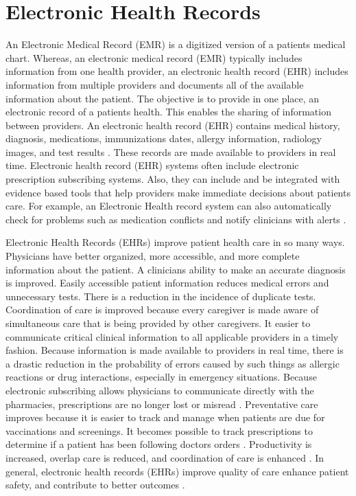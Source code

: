 \documentclass[sigconf]{acmart}
\begin{document}
\section{Electronic Health Records}

An Electronic Medical Record (EMR) is a digitized version of a patients medical chart.  Whereas, an electronic medical record (EMR) typically includes information from one health provider, an electronic health record (EHR) includes information from multiple providers and documents all of the available information about the patient.  The objective is to provide in one place, an electronic record of a patients health. This enables the sharing of information between providers. An electronic health record (EHR) contains medical history, diagnosis, medications, immunizations dates, allergy information, radiology images, and test results \cite{www-google-EHR}. These records are made available to providers in real time.  Electronic health record (EHR) systems often include electronic prescription subscribing systems. Also, they can include and be integrated with evidence based tools that help providers make immediate decisions about patients care. For example, an Electronic Health record system can also automatically check for problems such as medication conflicts and notify clinicians with alerts \cite{www-google-elec}.

Electronic Health Records (EHRs) improve patient health care in so many ways. Physicians have better organized, more accessible, and more complete information about the patient.  A clinicians ability to make an accurate diagnosis is improved.  Easily accessible patient information reduces medical errors and unnecessary tests. There is a reduction in the incidence of duplicate tests. Coordination of care is improved because every caregiver is made aware of simultaneous care that is being provided by other caregivers. It easier to communicate critical clinical information to all applicable providers in a timely fashion. Because information is made available to providers in real time, there is a drastic reduction in the probability of errors caused by such things as allergic reactions or drug interactions, especially in emergency situations.  Because electronic subscribing allows physicians to communicate directly with the pharmacies, prescriptions are no longer lost or misread \cite{www-google-elec}.  Preventative care improves because it is easier to track and manage when patients are due for vaccinations and screenings. It becomes possible to track prescriptions to determine if a patient has been following doctors orders \cite{www-google-datapine}.  Productivity is increased, overlap care is reduced, and coordination of care is enhanced \cite {www-google-christian}. In general, electronic health records (EHRs) improve quality of care enhance patient safety, and contribute to better outcomes \cite{www-google-elec}.
\end{document}

